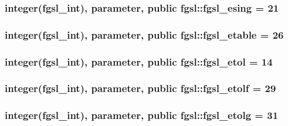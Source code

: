\hypertarget{classfgsl_aeb4c28b199599ec4c17ff7330a4ad10d}{
\subsubsection[{fgsl\-\_\-esing}]{\setlength{\rightskip}{0pt plus 5cm}integer({\bf fgsl\-\_\-int}), parameter, public fgsl\-::fgsl\-\_\-esing = 21}}\label{classfgsl_aeb4c28b199599ec4c17ff7330a4ad10d}
\hypertarget{classfgsl_ac1348341f3d95b02f852466ca383d1ae}{
\subsubsection[{fgsl\-\_\-etable}]{\setlength{\rightskip}{0pt plus 5cm}integer({\bf fgsl\-\_\-int}), parameter, public fgsl\-::fgsl\-\_\-etable = 26}}\label{classfgsl_ac1348341f3d95b02f852466ca383d1ae}
\hypertarget{classfgsl_a7e4da7bbb4435c2bceff8cf57d554015}{
\subsubsection[{fgsl\-\_\-etol}]{\setlength{\rightskip}{0pt plus 5cm}integer({\bf fgsl\-\_\-int}), parameter, public fgsl\-::fgsl\-\_\-etol = 14}}\label{classfgsl_a7e4da7bbb4435c2bceff8cf57d554015}
\hypertarget{classfgsl_a9b3ff0443a3c8e9570d06e762b1ca241}{
\subsubsection[{fgsl\-\_\-etolf}]{\setlength{\rightskip}{0pt plus 5cm}integer({\bf fgsl\-\_\-int}), parameter, public fgsl\-::fgsl\-\_\-etolf = 29}}\label{classfgsl_a9b3ff0443a3c8e9570d06e762b1ca241}
\hypertarget{classfgsl_a12d84e3678cb637e43f1a7a888558110}{
\subsubsection[{fgsl\-\_\-etolg}]{\setlength{\rightskip}{0pt plus 5cm}integer({\bf fgsl\-\_\-int}), parameter, public fgsl\-::fgsl\-\_\-etolg = 31}}\label{classfgsl_a12d84e3678cb637e43f1a7a888558110}
